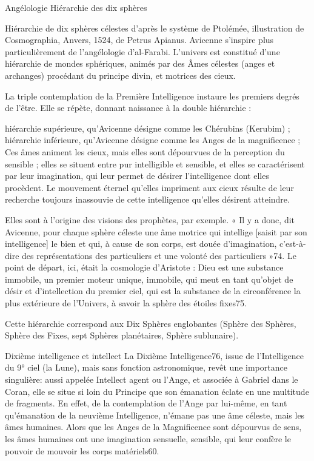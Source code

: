 Angélologie
Hiérarchie des dix sphères

Hiérarchie de dix sphères célestes d'après le système de Ptolémée, illustration de Cosmographia, Anvers, 1524, de Petrus Apianus.
Avicenne s'inspire plus particulièrement de l'angélologie d'al-Farabi. L'univers est constitué d'une hiérarchie de mondes sphériques, animés par des Âmes célestes (anges et archanges) procédant du principe divin, et motrices des cieux.

La triple contemplation de la Première Intelligence instaure les premiers degrés de l'être. Elle se répète, donnant naissance à la double hiérarchie :

hiérarchie supérieure, qu'Avicenne désigne comme les Chérubins (Kerubim) ;
hiérarchie inférieure, qu'Avicenne désigne comme les Anges de la magnificence ;
Ces âmes animent les cieux, mais elles sont dépourvues de la perception du sensible ; elles se situent entre pur intelligible et sensible, et elles se caractérisent par leur imagination, qui leur permet de désirer l'intelligence dont elles procèdent. Le mouvement éternel qu'elles impriment aux cieux résulte de leur recherche toujours inassouvie de cette intelligence qu'elles désirent atteindre.

Elles sont à l'origine des visions des prophètes, par exemple. « Il y a donc, dit Avicenne, pour chaque sphère céleste une âme motrice qui intellige [saisit par son intelligence] le bien et qui, à cause de son corps, est douée d'imagination, c'est-à-dire des représentations des particuliers et une volonté des particuliers »74. Le point de départ, ici, était la cosmologie d'Aristote : Dieu est une substance immobile, un premier moteur unique, immobile, qui meut en tant qu'objet de désir et d'intellection du premier ciel, qui est la substance de la circonférence la plus extérieure de l’Univers, à savoir la sphère des étoiles fixes75.

Cette hiérarchie correspond aux Dix Sphères englobantes (Sphère des Sphères, Sphère des Fixes, sept Sphères planétaires, Sphère sublunaire).

Dixième intelligence et intellect
La Dixième Intelligence76, issue de l'Intelligence du 9° ciel (la Lune), mais sans fonction astronomique, revêt une importance singulière: aussi appelée Intellect agent ou l'Ange, et associée à Gabriel dans le Coran, elle se situe si loin du Principe que son émanation éclate en une multitude de fragments. En effet, de la contemplation de l'Ange par lui-même, en tant qu'émanation de la neuvième Intelligence, n'émane pas une âme céleste, mais les âmes humaines. Alors que les Anges de la Magnificence sont dépourvus de sens, les âmes humaines ont une imagination sensuelle, sensible, qui leur confère le pouvoir de mouvoir les corps matériels60.

